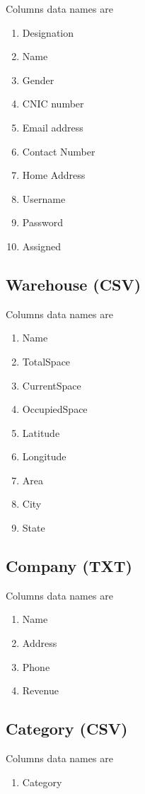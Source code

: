 \documentclass[12pt,a4paper]{article}
\begin{document}
Columns data names are
\begin{enumerate}
\item Designation 
\item Name 
\item Gender
\item CNIC number
\item Email address
\item Contact Number
\item Home Address
\item Username 
\item Password 
\item Assigned 
\end{enumerate}

\subsection{Warehouse (CSV)}

Columns data names are
\begin{enumerate}
\item Name			
\item TotalSpace		
\item CurrentSpace 	
\item OccupiedSpace 	
\item Latitude 		
\item Longitude 		
\item Area			
\item City			
\item State			

\end{enumerate}

\subsection{Company (TXT)}

Columns data names are
\begin{enumerate}
\item Name 	
\item Address
\item Phone 	
\item Revenue

\end{enumerate}


\subsection{Category (CSV)}
Columns data names are
\begin{enumerate} 
\item Category
\end{enumerate}
\end{document}
